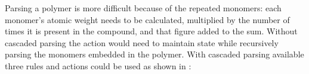 Parsing a polymer is more difficult because of the repeated monomers: each
monomer's atomic weight needs to be calculated, multiplied by the number of
times it is present in the compound, and that figure added to the sum.
Without cascaded parsing the action would need to maintain state while
recursively parsing the monomers embedded in the polymer.  With cascaded
parsing available three rules and actions could be used as shown in
:

\newlength{\chemicalactionwidth}
\setlength{\chemicalactionwidth}{\textwidth}
\addtolength{\chemicalactionwidth}{-30pt}
\addtolength{\chemicalactionwidth}{-130pt}
\addtolength{\chemicalactionwidth}{-24pt}


